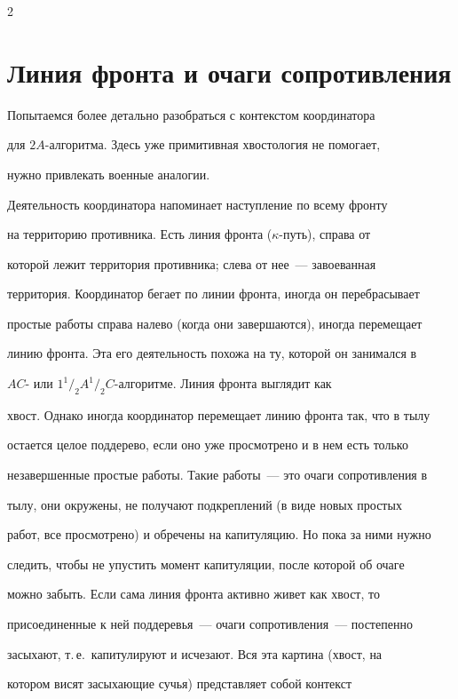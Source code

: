 \begin{multicols}{2}
\section{Линия фронта и очаги сопротивления}


      


      Попытаемся более детально разобраться с контекстом координатора 


для $2A$-ал\-го\-рит\-ма. Здесь уже примитивная хвостология не помогает, 


нужно привлекать военные аналогии. 


      


      Деятельность координатора напоминает наступление по всему фронту 


на территорию противника. Есть линия фронта ($\kappa$-путь), справа от 


которой лежит территория противника; слева от нее~--- завоеванная 


территория. Координатор бегает по линии фронта, иногда он перебрасывает 


простые работы справа налево (когда они завершаются), иногда перемещает 


линию фронта. Эта его деятельность похожа на ту, которой он занимался в 


$AC$- или $1^1/_2A^1/_2C$-ал\-го\-рит\-ме. Линия фронта выглядит как 


хвост. Однако иногда координатор перемещает линию фронта так, что в тылу 


остается целое поддерево, если оно уже просмотрено и в нем есть только 


незавершенные простые работы. Такие работы~--- это очаги сопротивления в 


тылу, они окружены, не получают подкреплений (в виде новых простых 


работ, все просмотрено) и обречены на капитуляцию. Но пока за ними нужно 


следить, чтобы не упустить момент капитуляции, после которой об очаге 


можно забыть. Если сама линия фронта активно живет как хвост, то 


присоединенные к ней поддеревья~--- очаги сопротивления~--- постепенно 


засыхают, т.\,е.\ капитулируют и исчезают. Вся эта картина (хвост, на 


котором висят засыхающие \mbox{сучья}) представляет собой контекст 



\end{multicols}
